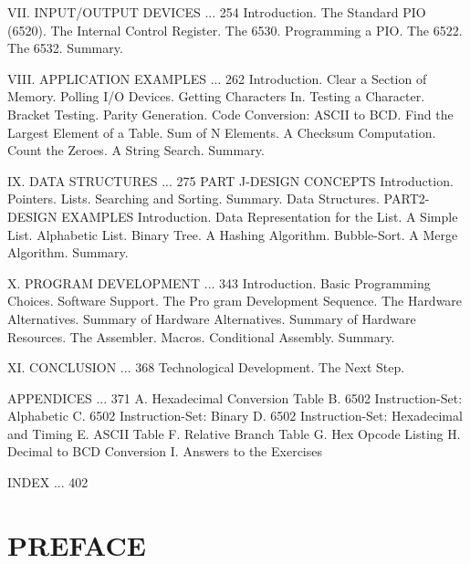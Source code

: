 VII. INPUT/OUTPUT DEVICES ... 254
Introduction. The Standard PIO (6520). The Internal Control Register. The 6530. Programming a PIO. The 6522. The 6532. Summary.

VIII. APPLICATION EXAMPLES ... 262
Introduction. Clear a Section of Memory. Polling I/O Devices. Getting Characters In. Testing a Character. Bracket Testing. Parity Generation. Code Conversion: ASCII to BCD. Find the Largest Element of a Table. Sum of N Elements. A Checksum Computation. Count the Zeroes. A String Search. Summary.

IX. DATA STRUCTURES ... 275
PART J-DESIGN CONCEPTS
Introduction. Pointers. Lists. Searching and Sorting. Summary. Data Structures.
PART2-DESIGN EXAMPLES
Introduction. Data Representation for the List. A Simple List. Alphabetic List. Binary Tree. A Hashing Algorithm. Bubble-Sort. A Merge Algorithm.
Summary.

X. PROGRAM DEVELOPMENT ... 343
Introduction. Basic Programming Choices. Software Support. The Pro gram Development Sequence. The Hardware Alternatives. Summary of Hardware Alternatives. Summary of Hardware Resources. The Assembler. Macros. Conditional Assembly. Summary.

XI. CONCLUSION ... 368
Technological Development. The Next Step.

APPENDICES ... 371
A. Hexadecimal Conversion Table
B. 6502 Instruction-Set: Alphabetic
C. 6502 Instruction-Set: Binary
D. 6502 Instruction-Set: Hexadecimal and Timing
E. ASCII Table
F. Relative Branch Table
G. Hex Opcode Listing
H. Decimal to BCD Conversion
I. Answers to the Exercises

INDEX ... 402

\section{PREFACE}

